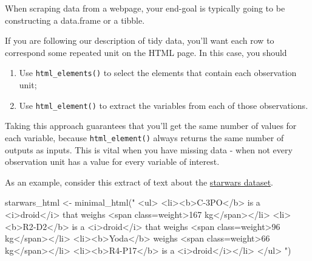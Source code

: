 \documentclass[
  letterpaper,
  DIV=11,
  numbers=noendperiod]{scrreprt}
\newenvironment{Shaded}{\begin{snugshade}}{\end{snugshade}}
\newcommand{\FunctionTok}[1]{\textcolor[rgb]{0.28,0.35,0.67}{#1}}
\newcommand{\NormalTok}[1]{\textcolor[rgb]{0.00,0.23,0.31}{#1}}
\newcommand{\OtherTok}[1]{\textcolor[rgb]{0.00,0.23,0.31}{#1}}
\newcommand{\StringTok}[1]{\textcolor[rgb]{0.13,0.47,0.30}{#1}}
\providecommand{\tightlist}{%
  \setlength{\itemsep}{0pt}\setlength{\parskip}{0pt}}\usepackage{longtable,booktabs,array}
\begin{document}
When scraping data from a webpage, your end-goal is typically going to
be constructing a data.frame or a tibble.

If you are following our description of tidy data, you'll want each row
to correspond some repeated unit on the HTML page. In this case, you
should

\begin{enumerate}
\def\labelenumi{\arabic{enumi}.}
\tightlist
\item
  Use \texttt{html\_elements()} to select the elements that contain each
  observation unit;
\item
  Use \texttt{html\_element()} to extract the variables from each of
  those observations.
\end{enumerate}

Taking this approach guarantees that you'll get the same number of
values for each variable, because \texttt{html\_element()} always
returns the same number of outputs as inputs. This is vital when you
have missing data - when not every observation unit has a value for
every variable of interest.

As an example, consider this extract of text about the
\href{https://dplyr.tidyverse.org/reference/starwars.html\#ref-examples}{starwars
dataset}.

\begin{Shaded}
\begin{Highlighting}[]
\NormalTok{starwars\_html }\OtherTok{\textless{}{-}} \FunctionTok{minimal\_html}\NormalTok{(}\StringTok{"}
\StringTok{  \textless{}ul\textgreater{}}
\StringTok{    \textless{}li\textgreater{}\textless{}b\textgreater{}C{-}3PO\textless{}/b\textgreater{} is a \textless{}i\textgreater{}droid\textless{}/i\textgreater{} that weighs \textless{}span class=\textquotesingle{}weight\textquotesingle{}\textgreater{}167 kg\textless{}/span\textgreater{}\textless{}/li\textgreater{}}
\StringTok{    \textless{}li\textgreater{}\textless{}b\textgreater{}R2{-}D2\textless{}/b\textgreater{} is a \textless{}i\textgreater{}droid\textless{}/i\textgreater{} that weighs \textless{}span class=\textquotesingle{}weight\textquotesingle{}\textgreater{}96 kg\textless{}/span\textgreater{}\textless{}/li\textgreater{}}
\StringTok{    \textless{}li\textgreater{}\textless{}b\textgreater{}Yoda\textless{}/b\textgreater{} weighs \textless{}span class=\textquotesingle{}weight\textquotesingle{}\textgreater{}66 kg\textless{}/span\textgreater{}\textless{}/li\textgreater{}}
\StringTok{    \textless{}li\textgreater{}\textless{}b\textgreater{}R4{-}P17\textless{}/b\textgreater{} is a \textless{}i\textgreater{}droid\textless{}/i\textgreater{}\textless{}/li\textgreater{}}
\StringTok{  \textless{}/ul\textgreater{}}
\StringTok{  "}\NormalTok{)}
\end{Highlighting}
\end{Shaded}
\end{document}
